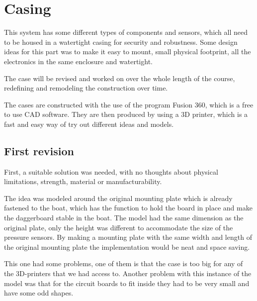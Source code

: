 
\section{Casing}
This system has some different types of components and sensors, which all need to be housed in a watertight casing for security and robustness. Some design ideas for this part was to make it easy to mount, small physical footprint, all the electronics in the same enclosure and watertight.  

The case will be revised and worked on over the whole length of the course, redefining and remodeling the construction over time.  

The cases are constructed with the use of the program Fusion 360, which is a free to use CAD software. They are then produced by using a 3D printer, which is a fast and easy way of try out different ideas and models.   

\subsection{First revision}
First, a suitable solution was needed, with no thoughts about physical limitations, strength, material or manufacturability.  

The idea was modeled around the original mounting plate which is already fastened to the boat, which has the function to hold the board in place and make the daggerboard stable in the boat. The model had the same dimension as the original plate, only the height was different to accommodate the size of the pressure sensors. By making a mounting plate with the same width and length of the original mounting plate the implementation would be neat and space saving. 

This one had some problems, one of them is that the case is too big for any of the 3D-printers that we had access to. Another problem with this instance of the model was that for the circuit boards to fit inside they had to be very small and have some odd shapes.  

